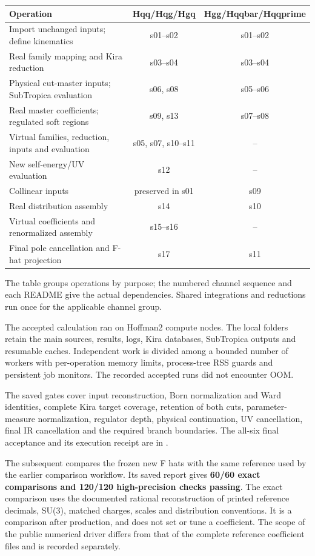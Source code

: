 \documentclass[11pt,a4paper]{article}
\begin{document}
\begin{center}
\small
\begin{tabularx}{\textwidth}{@{}X c c@{}}
\toprule
Operation & Hqq/Hqg/Hgq & Hgg/Hqqbar/Hqqprime\\
\midrule
Import unchanged inputs; define kinematics & s01--s02 & s01--s02\\
Real family mapping and Kira reduction & s03--s04 & s03--s04\\
Physical cut-master inputs; SubTropica evaluation & s06, s08 & s05--s06\\
Real master coefficients; regulated soft regions & s09, s13 & s07--s08\\
Virtual families, reduction, inputs and evaluation & s05, s07, s10--s11 & --\\
New self-energy/UV evaluation & s12 & --\\
Collinear inputs & preserved in s01 & s09\\
Real distribution assembly & s14 & s10\\
Virtual coefficients and renormalized assembly & s15--s16 & --\\
Final pole cancellation and F-hat projection & s17 & s11\\
\bottomrule
\end{tabularx}
\end{center}
The table groups operations by purpose; the numbered channel sequence
and each README give the actual dependencies. Shared integrations and
reductions run once for the applicable channel group.

The accepted calculation ran on Hoffman2 compute nodes. The local folders
retain the main sources, results, logs, Kira databases, SubTropica outputs
and resumable caches. Independent work is divided among a bounded number
of workers with per-operation memory limits, process-tree RSS guards and
persistent job monitors. The recorded accepted runs did not encounter OOM.

The saved gates cover input reconstruction, Born normalization and Ward
identities, complete Kira target coverage, retention of both cuts,
parameter-measure normalization, regulator depth, physical continuation,
UV cancellation, final IR cancellation and the required branch boundaries.
The all-six final acceptance and its execution receipt are in
.

The subsequent  compares the frozen new F hats
with the same reference used by the earlier comparison workflow. Its saved
report gives \textbf{60/60 exact comparisons and 120/120 high-precision
checks passing}. The exact comparison uses the documented rational
reconstruction of printed reference decimals, SU(3), matched charges,
scales and distribution conventions. It is a comparison after production,
and does not set or tune a coefficient. The scope of the public numerical
driver differs from that of the complete reference coefficient files and
is recorded separately.
\end{document}
